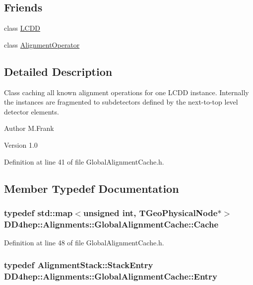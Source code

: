 \subsection*{Friends}
\begin{DoxyCompactItemize}
\item 
class \hyperlink{class_d_d4hep_1_1_alignments_1_1_global_alignment_cache_a7e41b5a9f3843a7e39b0a2f9d618ae4a}{LCDD}
\item 
class \hyperlink{class_d_d4hep_1_1_alignments_1_1_global_alignment_cache_a0123c592b59946302df6795784a503e4}{AlignmentOperator}
\end{DoxyCompactItemize}


\subsection{Detailed Description}
Class caching all known alignment operations for one LCDD instance. Internally the instances are fragmented to subdetectors defined by the next-\/to-\/top level detector elements.

\begin{DoxyAuthor}{Author}
M.Frank 
\end{DoxyAuthor}
\begin{DoxyVersion}{Version}
1.0 
\end{DoxyVersion}


Definition at line 41 of file GlobalAlignmentCache.h.

\subsection{Member Typedef Documentation}
\hypertarget{class_d_d4hep_1_1_alignments_1_1_global_alignment_cache_a51cc6e8b7d9d85cfc296e8db7f360604}{
\subsubsection[{Cache}]{\setlength{\rightskip}{0pt plus 5cm}typedef std::map$<$unsigned int, TGeoPhysicalNode$\ast$$>$ {\bf DD4hep::Alignments::GlobalAlignmentCache::Cache}}}
\label{class_d_d4hep_1_1_alignments_1_1_global_alignment_cache_a51cc6e8b7d9d85cfc296e8db7f360604}


Definition at line 48 of file GlobalAlignmentCache.h.\hypertarget{class_d_d4hep_1_1_alignments_1_1_global_alignment_cache_a57c878d71fabf28ccab5c04f45f48fb1}{
\subsubsection[{Entry}]{\setlength{\rightskip}{0pt plus 5cm}typedef {\bf AlignmentStack::StackEntry} {\bf DD4hep::Alignments::GlobalAlignmentCache::Entry}}}
\label{class_d_d4hep_1_1_alignments_1_1_global_alignment_cache_a57c878d71fabf28ccab5c04f45f48fb1}


